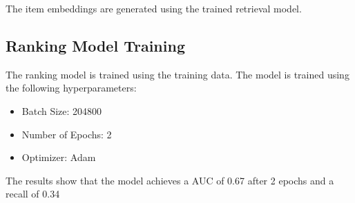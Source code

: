 The item embeddings are generated using the trained retrieval model.

\subsection{Ranking Model Training}

The ranking model is trained using the training data. The model is trained using the following hyperparameters:

\begin{itemize}
\item Batch Size: 204800
\item Number of Epochs: 2
\item Optimizer: Adam
\end{itemize}

The results show that the model achieves a AUC of 0.67 after 2 epochs and a recall of 0.34
